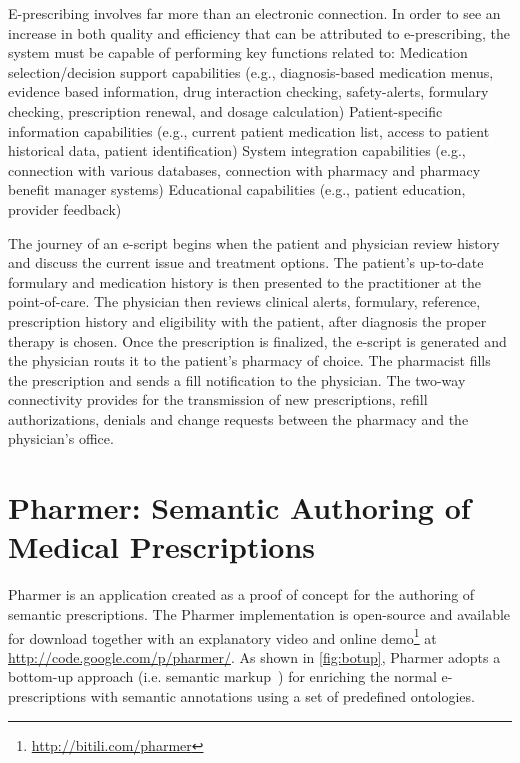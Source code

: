 \documentclass[10pt, conference, compsocconf]{IEEEtran}
\begin{document}
E-prescribing involves far more than an electronic connection. In order to see an increase in both quality and efficiency that can be attributed to e-prescribing, the system must be capable of performing key functions related to:
Medication selection/decision support capabilities (e.g., diagnosis-based medication menus, evidence based information, drug interaction checking, safety-alerts, formulary checking, prescription renewal, and dosage calculation)
Patient-specific information capabilities (e.g., current patient medication list, access to patient historical data, patient identification)
System integration capabilities (e.g., connection with various databases, connection with pharmacy and pharmacy benefit manager systems)
Educational capabilities (e.g., patient education, provider feedback)

The journey of an e-script begins when the patient and physician review history and discuss the current issue and treatment options. The patient’s up-to-date formulary and medication history is then presented to the practitioner at the point-of-care.
The physician then reviews clinical alerts, formulary, reference, prescription history and eligibility with the patient, after diagnosis the proper therapy is chosen.
Once the prescription is finalized, the e-script is generated and the physician routs it to the patient’s pharmacy of choice. The pharmacist fills the prescription and sends a fill notification to the physician.
The two-way connectivity provides for the transmission of new prescriptions, refill authorizations, denials and change requests between the pharmacy and the physician’s office.

\section{Pharmer: Semantic Authoring of Medical Prescriptions}
\label{sec:pharmer}
Pharmer is an application created as a proof of concept for the authoring of semantic prescriptions.
The Pharmer implementation is open-source and available for download together with an explanatory video and online demo\footnote{\url{http://bitili.com/pharmer}} at \url{http://code.google.com/p/pharmer/}.
As shown in \autoref{fig:botup}, Pharmer adopts a bottom-up approach (i.e. semantic markup~\cite{araujo2010}) for enriching the normal e-prescriptions with semantic annotations using a set of predefined ontologies.
\end{document}
